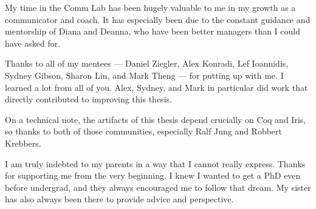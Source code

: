 My time in the Comm Lab has been hugely valuable to me in my growth as a
communicator and coach. It has especially been due to the constant guidance and
mentorship of Diana and Deanna, who have been better managers than I could have
asked for.

Thanks to all of my mentees --- Daniel Ziegler, Alex Konradi, Lef Ioannidis,
Sydney Gibson, Sharon Lin, and Mark Theng --- for putting up with me. I learned
a lot from all of you. Alex, Sydney, and Mark in particular did work that
directly contributed to improving this thesis.

On a technical note, the artifacts of this thesis depend crucially on Coq and
Iris, so thanks to both of those communities, especially Ralf Jung and Robbert
Krebbers.

I am truly indebted to my parents in a way that I cannot really express. Thanks
for supporting me from the very beginning. I knew I wanted to get a PhD even
before undergrad, and they always encouraged me to follow that dream. My sister
has also always been there to provide advice and perspective.
